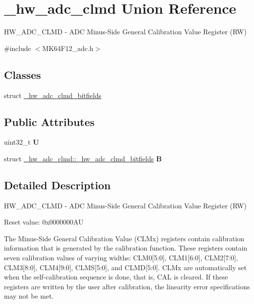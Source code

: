 \hypertarget{union__hw__adc__clmd}{}\section{\+\_\+hw\+\_\+adc\+\_\+clmd Union Reference}
\label{union__hw__adc__clmd}


H\+W\+\_\+\+A\+D\+C\+\_\+\+C\+L\+MD -\/ A\+DC Minus-\/\+Side General Calibration Value Register (RW)  




{\ttfamily \#include $<$M\+K64\+F12\+\_\+adc.\+h$>$}

\subsection*{Classes}
\begin{DoxyCompactItemize}
\item 
struct \hyperlink{struct__hw__adc__clmd_1_1__hw__adc__clmd__bitfields}{\+\_\+hw\+\_\+adc\+\_\+clmd\+\_\+bitfields}
\end{DoxyCompactItemize}
\subsection*{Public Attributes}
\begin{DoxyCompactItemize}
\item 
uint32\+\_\+t {\bfseries U}\hypertarget{union__hw__adc__clmd_a1aec566f06569c9efee7a80ac8321b3d}{}\label{union__hw__adc__clmd_a1aec566f06569c9efee7a80ac8321b3d}

\item 
struct \hyperlink{struct__hw__adc__clmd_1_1__hw__adc__clmd__bitfields}{\+\_\+hw\+\_\+adc\+\_\+clmd\+::\+\_\+hw\+\_\+adc\+\_\+clmd\+\_\+bitfields} {\bfseries B}\hypertarget{union__hw__adc__clmd_a6a347cdf9ab7663340aa32417f42fa7a}{}\label{union__hw__adc__clmd_a6a347cdf9ab7663340aa32417f42fa7a}

\end{DoxyCompactItemize}


\subsection{Detailed Description}
H\+W\+\_\+\+A\+D\+C\+\_\+\+C\+L\+MD -\/ A\+DC Minus-\/\+Side General Calibration Value Register (RW) 

Reset value\+: 0x0000000\+AU

The Minus-\/\+Side General Calibration Value (C\+L\+Mx) registers contain calibration information that is generated by the calibration function. These registers contain seven calibration values of varying widths\+: C\+L\+M0\mbox{[}5\+:0\mbox{]}, C\+L\+M1\mbox{[}6\+:0\mbox{]}, C\+L\+M2\mbox{[}7\+:0\mbox{]}, C\+L\+M3\mbox{[}8\+:0\mbox{]}, C\+L\+M4\mbox{[}9\+:0\mbox{]}, C\+L\+MS\mbox{[}5\+:0\mbox{]}, and C\+L\+MD\mbox{[}5\+:0\mbox{]}. C\+L\+Mx are automatically set when the self-\/calibration sequence is done, that is, C\+AL is cleared. If these registers are written by the user after calibration, the linearity error specifications may not be met. 

